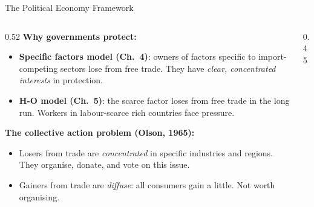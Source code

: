 \documentclass[aspectratio=169]{beamer}
\begin{document}
\begin{frame}{The Political Economy Framework}
\begin{columns}
\begin{column}{0.52\textwidth}
\textbf{Why governments protect:}
\begin{itemize}
  \item \textbf{Specific factors model (Ch.~4)}: owners of factors specific to import-competing sectors lose from free trade. They have \emph{clear, concentrated interests} in protection.
  \item \textbf{H-O model (Ch.~5)}: the scarce factor loses from free trade in the long run. Workers in labour-scarce rich countries face pressure.
\end{itemize}
\vspace{0.3em}
\textbf{The collective action problem (Olson, 1965):}
\begin{itemize}
  \item Losers from trade are \emph{concentrated} in specific industries and regions. They organise, donate, and vote on this issue.
  \item Gainers from trade are \emph{diffuse}: all consumers gain a little. Not worth organising.
\end{itemize}
\end{column}
\begin{column}{0.45\textwidth}
\end{column}
\end{columns}
\end{frame}
\end{document}
